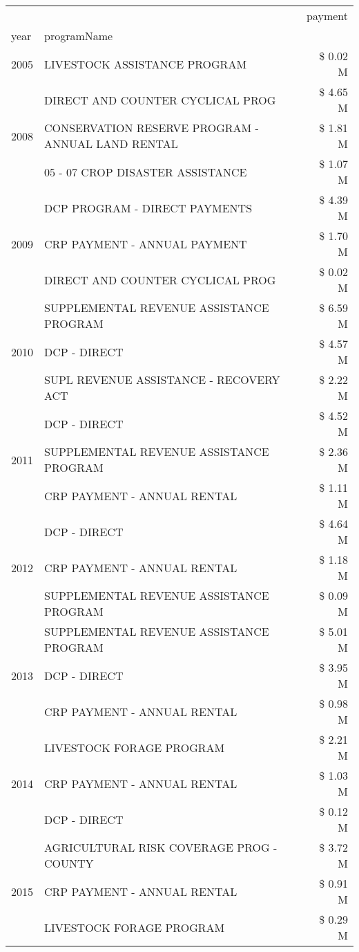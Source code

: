 \begin{tabular}{llr}
\toprule
 &  & payment \\
year & programName &  \\
\midrule
2005 & LIVESTOCK ASSISTANCE PROGRAM & \$ 0.02 M \\
\cline{1-3}
\multirow[t]{3}{*}{2008} & DIRECT AND COUNTER CYCLICAL PROG & \$ 4.65 M \\
 & CONSERVATION RESERVE PROGRAM - ANNUAL LAND RENTAL & \$ 1.81 M \\
 & 05 - 07 CROP DISASTER ASSISTANCE & \$ 1.07 M \\
\cline{1-3}
\multirow[t]{3}{*}{2009} & DCP PROGRAM - DIRECT PAYMENTS & \$ 4.39 M \\
 & CRP PAYMENT - ANNUAL PAYMENT & \$ 1.70 M \\
 & DIRECT AND COUNTER CYCLICAL PROG & \$ 0.02 M \\
\cline{1-3}
\multirow[t]{3}{*}{2010} & SUPPLEMENTAL REVENUE ASSISTANCE PROGRAM & \$ 6.59 M \\
 & DCP - DIRECT & \$ 4.57 M \\
 & SUPL REVENUE ASSISTANCE - RECOVERY ACT & \$ 2.22 M \\
\cline{1-3}
\multirow[t]{3}{*}{2011} & DCP - DIRECT & \$ 4.52 M \\
 & SUPPLEMENTAL REVENUE ASSISTANCE PROGRAM & \$ 2.36 M \\
 & CRP PAYMENT - ANNUAL RENTAL & \$ 1.11 M \\
\cline{1-3}
\multirow[t]{3}{*}{2012} & DCP - DIRECT & \$ 4.64 M \\
 & CRP PAYMENT - ANNUAL RENTAL & \$ 1.18 M \\
 & SUPPLEMENTAL REVENUE ASSISTANCE PROGRAM & \$ 0.09 M \\
\cline{1-3}
\multirow[t]{3}{*}{2013} & SUPPLEMENTAL REVENUE ASSISTANCE PROGRAM & \$ 5.01 M \\
 & DCP - DIRECT & \$ 3.95 M \\
 & CRP PAYMENT - ANNUAL RENTAL & \$ 0.98 M \\
\cline{1-3}
\multirow[t]{3}{*}{2014} & LIVESTOCK FORAGE PROGRAM & \$ 2.21 M \\
 & CRP PAYMENT - ANNUAL RENTAL & \$ 1.03 M \\
 & DCP - DIRECT & \$ 0.12 M \\
\cline{1-3}
\multirow[t]{3}{*}{2015} & AGRICULTURAL RISK COVERAGE PROG - COUNTY & \$ 3.72 M \\
 & CRP PAYMENT - ANNUAL RENTAL & \$ 0.91 M \\
 & LIVESTOCK FORAGE PROGRAM & \$ 0.29 M \\

\end{tabular}
